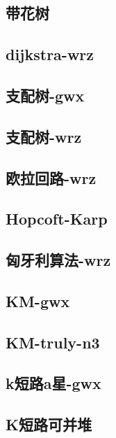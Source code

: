 \documentclass[titlepage,a4paper,10pt]{article}
\begin{document}
\begin{spacing}{0.8}
			\subsection{带花树}
				
			\subsection{dijkstra-wrz}
				
			\subsection{支配树-gwx}
				
			\subsection{支配树-wrz}
				
			\subsection{欧拉回路-wrz}
				
			\subsection{Hopcoft-Karp}
				
			\subsection{匈牙利算法-wrz}
				
			\subsection{KM-gwx}
				
			\subsection{KM-truly-n3}
				
			\subsection{k短路a星-gwx}
				
			\subsection{K短路可并堆}
				

\end{spacing}
\end{document}
